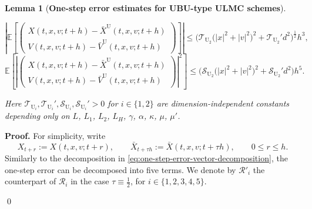 \documentclass[12pt]{article}
\newenvironment{redtext}
  {\color{black}\ignorespaces}
  {\ignorespacesafterend}
\numberwithin{equation}{section}
\renewenvironment{proof}%
  {\begin{trivlist}%
   \item[]\ignorespaces}%
  {\qed\end{trivlist}}
\newtheorem{lem}{Lemma}[section]
\begin{document}
\begin{redtext}
\begin{lem}[\textbf{One-step error estimates for UBU-type ULMC schemes}]
\begin{enumerate}
\begin{equation}
\label{eq:one-step-weak-error-UBU-hl}
\left|
\mathbb E
\left[
\left(
\begin{aligned}
X(t,x,v;t+h)
-
\bar X^{\mathrm U}(t,x,v;t+h)
\\
V(t,x,v;t+h)
-
\bar V^{\mathrm U}(t,x,v;t+h)
\end{aligned}
\right)
\right]
\right|
\leq
\Big(
\mathcal T_{\mathrm{U}_2}
\big(
|x|^2+|v|^2
\big)^2
+
\mathcal T_{\mathrm{U}_2}'d^2
\Big)^{\frac{1}{2}}
h^{3},
\end{equation}
\begin{equation}
\label{eq:one-step-strong-error-UBU-hl}
\mathbb E
\left[
\left|
\left(
\begin{aligned}
X(t,x,v;t+h)-\bar X^{\mathrm U}(t,x,v;t+h)
\\
V(t,x,v;t+h)-\bar V^{\mathrm U}(t,x,v;t+h)
\end{aligned}
\right)
\right|^2
\right]
\leq
\Big(
\mathcal S_{\mathrm{U}_2}
\big(
|x|^2+|v|^2
\big)^2
+
\mathcal S_{\mathrm{U}_2}'d^2
\Big)h^{5}.
\end{equation}
\end{enumerate}



Here $\mathcal T_{\mathrm{U}_i},\mathcal T_{\mathrm{U}_i}',\mathcal S_{\mathrm{U}_i},\mathcal S_{\mathrm{U}_i}'>0 $ for $ i\in\{1,2\}$
are dimension-independent constants depending only on
$L$, $L_1$, $L_2$, $L_H$, $\gamma$, $\alpha$, $\kappa$, $\mu$, $\mu'$.
\end{lem}

\iffalse
\begin{proof}
\textbf{Proof.}
For simplicity, write
\[
X_{t+r}:=X(t,x,v;t+r),
\qquad
\bar X_{t+\tau h}:=\bar X(t,x,v;t+\tau h),
\qquad 0\leq r\leq h .
\]
Similarly to the decomposition in \eqref{eq:one-step-error-vector-decomposition}, the one-step error can be decomposed into five terms. We denote by $\mathcal{R}'_i$ the counterpart of $\mathcal{R}_i$ in the case $\tau\equiv\frac12$, for $i\in\{1,2,3,4,5\}$.


\end{proof}
\end{redtext}
\end{document}
